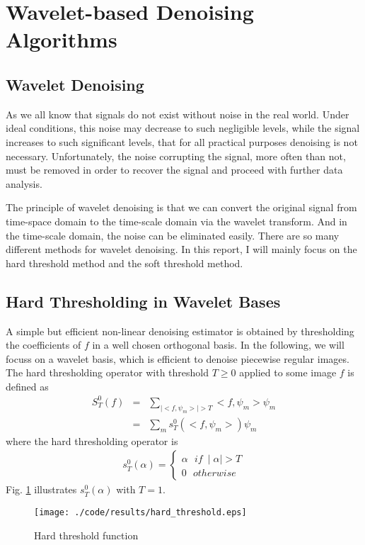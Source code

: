 \documentclass[journal,comsoc]{IEEEtran}
\begin{document}

\section{Wavelet-based Denoising Algorithms}
\label{sec:wavelet-based-algorithms}

\subsection{Wavelet Denoising}
\label{sec:wavelet-denoising}

As we all know that signals do not exist without noise in the real world.
Under ideal conditions, this noise may decrease to such negligible
levels, while the signal increases to such significant levels, that for all practical purposes denoising
is not necessary. Unfortunately, the noise corrupting the signal, more often than not, must be
removed in order to recover the signal and proceed with further data analysis.

The principle of wavelet denoising is that we can convert the original signal from time-space domain to
the time-scale domain via the wavelet transform. And in the time-scale domain, the noise can be eliminated
easily. There are so many different methods for wavelet denoising. In this report, I will mainly focus on
the hard threshold method and the soft threshold method.

\subsection{Hard Thresholding in Wavelet Bases}
\label{subsec:hard-thresholding-in-wavelet-bases}

A simple but efficient non-linear denoising estimator is obtained by thresholding the coefficients of $f$
in a well chosen orthogonal basis.
In the following, we will focuss on a wavelet basis, which is efficient to denoise piecewise regular images.
The hard thresholding operator with threshold $T\ge{0}$ applied to some image $f$ is defined as
\begin{eqnarray}
  S_T^0(f)&=&\sum_{\mid{<f,\psi_m>\mid}>T}<f,\psi_m>\psi_m\\
  &=&\sum_{m}s_T^0{(<f,\psi_m>)\psi_m}\nonumber
\end{eqnarray}
where the hard thresholding operator is
\begin{eqnarray}
  s_T^{0}(\alpha)=
  \begin{cases}
    \alpha\ \ \ if\ \mid{\alpha}\mid>T\\
    0\ \ \ otherwise
  \end{cases}
\end{eqnarray}
Fig. \ref{fig:hard-threshold-function} illustrates $s_T^0{(\alpha)}$ with $T=1$.
\begin{figure}[!htb]
  \centering
  \texttt{[image: ./code/results/hard\_threshold.eps]}
  \caption{Hard threshold function}
  \label{fig:hard-threshold-function}    
\end{figure}
\end{document}
